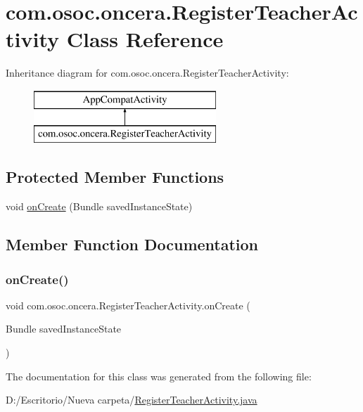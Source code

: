 \hypertarget{classcom_1_1osoc_1_1oncera_1_1_register_teacher_activity}{}\section{com.\+osoc.\+oncera.\+Register\+Teacher\+Activity Class Reference}
\label{classcom_1_1osoc_1_1oncera_1_1_register_teacher_activity}
Inheritance diagram for com.\+osoc.\+oncera.\+Register\+Teacher\+Activity\+:\begin{figure}[H]
\begin{center}
\leavevmode
\includegraphics[height=2.000000cm]{classcom_1_1osoc_1_1oncera_1_1_register_teacher_activity}
\end{center}
\end{figure}
\subsection*{Protected Member Functions}
\begin{DoxyCompactItemize}
\item 
void \mbox{\hyperlink{classcom_1_1osoc_1_1oncera_1_1_register_teacher_activity_ad72e9c777439609a8485f8383dad941a}{on\+Create}} (Bundle saved\+Instance\+State)
\end{DoxyCompactItemize}


\subsection{Member Function Documentation}
\mbox{\label{classcom_1_1osoc_1_1oncera_1_1_register_teacher_activity_ad72e9c777439609a8485f8383dad941a}} 
\subsubsection{\texorpdfstring{onCreate()}{onCreate()}}
{\footnotesize\ttfamily void com.\+osoc.\+oncera.\+Register\+Teacher\+Activity.\+on\+Create (\begin{DoxyParamCaption}\item[{Bundle}]{saved\+Instance\+State }\end{DoxyParamCaption})\hspace{0.3cm}{\ttfamily [protected]}}



The documentation for this class was generated from the following file\+:\begin{DoxyCompactItemize}
\item 
D\+:/\+Escritorio/\+Nueva carpeta/\mbox{\hyperlink{_register_teacher_activity_8java}{Register\+Teacher\+Activity.\+java}}\end{DoxyCompactItemize}
